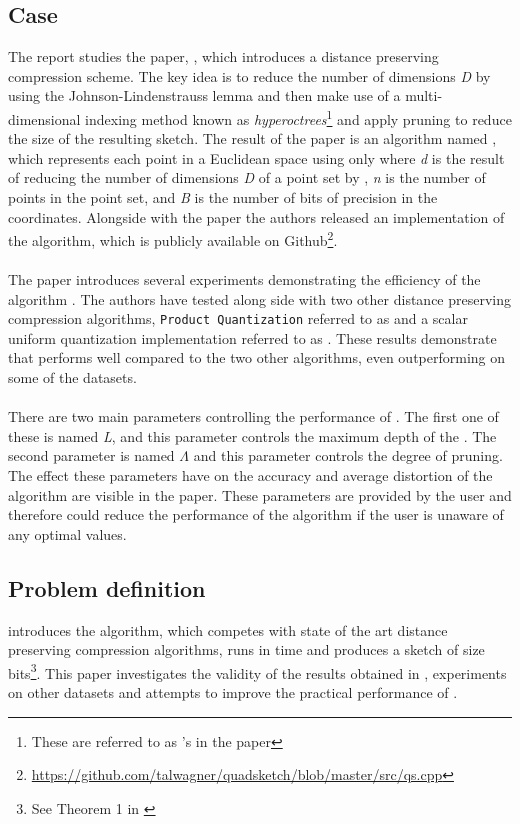 \subsection{Case} %
The report studies the paper, \cite{wagner17}, which introduces a distance preserving compression scheme. The key idea is to reduce the number of dimensions \textit{D} by using the Johnson-Lindenstrauss lemma \cite{JohnL} and then make use of a multi-dimensional indexing method known as \textit{hyperoctrees}\footnote{These are referred to as \qt{}'s in the paper} and apply pruning to reduce the size of the resulting sketch. The result of the paper is an algorithm named \qs{}, which represents each point in a Euclidean space using only  where \textit{d} is the result of reducing the number of dimensions \textit{D} of a point set by , \textit{n} is the number of points in the point set, and \textit{B} is the number of bits of precision in the coordinates. Alongside with the paper the authors released an implementation of the algorithm, which is publicly available on Github\footnote{\url{https://github.com/talwagner/quadsketch/blob/master/src/qs.cpp}}. 
\\
\\
The paper introduces several experiments demonstrating the efficiency of the algorithm \qs{}. The authors have tested \qs{} along side with two other distance preserving compression algorithms, \texttt{Product Quantization} referred to as \pq{} and a scalar uniform quantization implementation referred to as \gr{}. These results demonstrate that \qs{} performs well compared to the two other algorithms, even outperforming \pq{} on some of the datasets. 
\\
\\
There are two main parameters controlling the performance of \qs{}. The first one of these is named \textit{L}, and this parameter controls the maximum depth of the \qt{}. The second parameter is named $\Lambda$ and this parameter controls the degree of pruning. The effect these parameters have on the accuracy and average distortion of the algorithm are visible in the paper. These parameters are provided by the user and therefore could reduce the performance of the algorithm if the user is unaware of any optimal values.
\subsection{Problem definition} %
\cite{wagner17} introduces the \qs{} algorithm, which competes with state of the art distance preserving compression algorithms, \qs{} runs in  time and produces a sketch of size  bits\footnote{See Theorem 1 in \cite{wagner17}}. This paper investigates the validity of the results obtained in \cite{wagner17}, experiments on other datasets and attempts to improve the practical performance of \qs{}.



